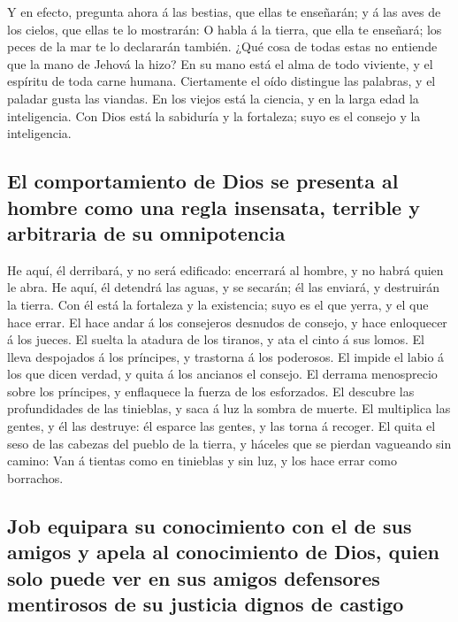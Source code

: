  Y en efecto, pregunta ahora á las bestias, que ellas te
enseñarán; y á las aves de los cielos, que ellas te lo mostrarán:
 O habla á la tierra, que ella te enseñará; los peces de la
mar te lo declararán también.  ¿Qué cosa de todas estas no
entiende que la mano de Jehová la hizo?  En su mano está el
alma de todo viviente, y el espíritu de toda carne humana. 
Ciertamente el oído distingue las palabras, y el paladar gusta las
viandas.  En los viejos está la ciencia, y en la larga edad
la inteligencia.  Con Dios está la sabiduría y la
fortaleza; suyo es el consejo y la inteligencia.

\hypertarget{el-comportamiento-de-dios-se-presenta-al-hombre-como-una-regla-insensata-terrible-y-arbitraria-de-su-omnipotencia}{%
\subsection{El comportamiento de Dios se presenta al hombre como una
regla insensata, terrible y arbitraria de su
omnipotencia}\label{el-comportamiento-de-dios-se-presenta-al-hombre-como-una-regla-insensata-terrible-y-arbitraria-de-su-omnipotencia}}

 He aquí, él derribará, y no será edificado: encerrará al
hombre, y no habrá quien le abra.  He aquí, él detendrá las
aguas, y se secarán; él las enviará, y destruirán la tierra.
 Con él está la fortaleza y la existencia; suyo es el que
yerra, y el que hace errar.  El hace andar á los consejeros
desnudos de consejo, y hace enloquecer á los jueces.  El
suelta la atadura de los tiranos, y ata el cinto á sus lomos.
 El lleva despojados á los príncipes, y trastorna á los
poderosos.  El impide el labio á los que dicen verdad, y
quita á los ancianos el consejo.  El derrama menosprecio
sobre los príncipes, y enflaquece la fuerza de los esforzados.
 El descubre las profundidades de las tinieblas, y saca á
luz la sombra de muerte.  El multiplica las gentes, y él
las destruye: él esparce las gentes, y las torna á recoger.
 El quita el seso de las cabezas del pueblo de la tierra, y
háceles que se pierdan vagueando sin camino:  Van á tientas
como en tinieblas y sin luz, y los hace errar como borrachos.

\hypertarget{job-equipara-su-conocimiento-con-el-de-sus-amigos-y-apela-al-conocimiento-de-dios-quien-solo-puede-ver-en-sus-amigos-defensores-mentirosos-de-su-justicia-dignos-de-castigo}{%
\subsection{Job equipara su conocimiento con el de sus amigos y apela al
conocimiento de Dios, quien solo puede ver en sus amigos defensores
mentirosos de su justicia dignos de
castigo}\label{job-equipara-su-conocimiento-con-el-de-sus-amigos-y-apela-al-conocimiento-de-dios-quien-solo-puede-ver-en-sus-amigos-defensores-mentirosos-de-su-justicia-dignos-de-castigo}}

